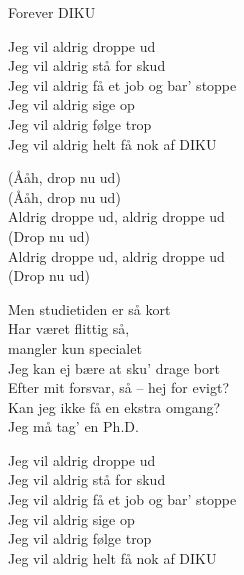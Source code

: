 \begin{song}{Forever DIKU}
  \begin{SBChorus}
    Jeg vil aldrig droppe ud\\
    Jeg vil aldrig stå for skud\\
    Jeg vil aldrig få et job og bar' stoppe\\
    Jeg vil aldrig sige op\\
    Jeg vil aldrig følge trop\\
    Jeg vil aldrig helt få nok af DIKU
  \end{SBChorus}



  \begin{SBSection*}
    (Ååh, drop nu ud)\\
    (Ååh, drop nu ud)\\
    Aldrig droppe ud, aldrig droppe ud\\
    (Drop nu ud)\\
    Aldrig droppe ud, aldrig droppe ud\\
    (Drop nu ud)
  \end{SBSection*}

  \begin{SBVerse}
    Men studietiden er så kort\\
    Har været flittig så,\\
    mangler kun specialet\\
    Jeg kan ej bære at sku' drage bort\\
    Efter mit forsvar, så -- hej for evigt?\\
    Kan jeg ikke få en ekstra omgang?\\
    Jeg må tag' en Ph.D.
  \end{SBVerse}

  \begin{SBChorus}
    Jeg vil aldrig droppe ud\\
    Jeg vil aldrig stå for skud\\
    Jeg vil aldrig få et job og bar' stoppe\\
    Jeg vil aldrig sige op\\
    Jeg vil aldrig følge trop\\
    Jeg vil aldrig helt få nok af DIKU
  \end{SBChorus}


\end{song}
